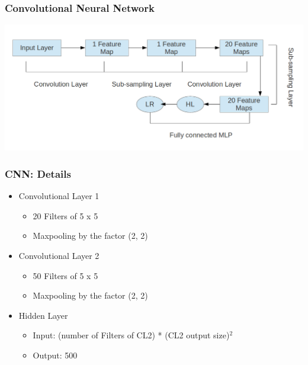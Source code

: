 \documentclass[14pt,mathserif]{beamer}
\begin{document}
\frame
{
  \frametitle{Convolutional Neural Network}

  \setlength{\leftmargini}{0em}
  \setlength{\leftmarginii}{1em}\includegraphics[scale=0.3]{cnn.png} 
}

\frame
{
  \frametitle{CNN: Details}

  \setlength{\leftmargini}{0em}
  \setlength{\leftmarginii}{1em}
   \begin{itemize}
     \setlength{\itemsep}{1em}
     \item Convolutional Layer 1
      \begin{itemize}
      	\item 20 Filters of 5 x 5
        	\item Maxpooling by the factor (2, 2)
        	\end{itemize}
      \item Convolutional Layer 2
      	\begin{itemize}
      	\item 50 Filters of 5 x 5
        	\item Maxpooling by the factor (2, 2)
        	\end{itemize}
     \item Hidden Layer
      \begin{itemize}
      	\item Input: (number of Filters of CL2) * (CL2 output size)${^{2}}$
        	\item Output: 500 
        	\end{itemize}
   \end{itemize}
}
\end{document}
